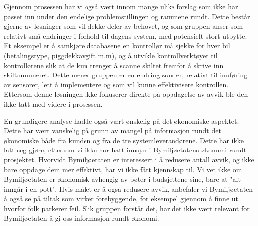 \documentclass[xetex]{beamer}
\begin{document}
\begin{frame}
	Gjennom prosessen har vi også vært innom mange ulike forslag som ikke har passet 
inn under den endelige problemstillingen og rammene rundt. Dette består gjerne av 
løsninger som vil dekke deler av behovet, og som gruppen anser som relativt \alert{små 
endringer} i forhold til dagens system, med \alert{potensielt stort utbytte}. Et eksempel er å 
samkjøre databasene en kontrollør må sjekke for hver bil (betalingstype, piggdekkavgift 
m.m), og å utvikle kontrollverktøyet til kontrollørene slik at de kun trenger å \alert{scanne skiltet} fremfor å skrive inn skiltnummeret. Dette mener gruppen er en endring som er, relativt 
til innføring av sensorer, lett å implementere og som vil kunne effektivisere kontrollen. 
Ettersom denne løsningen ikke fokuserer direkte på oppdagelse av avvik ble den ikke 
tatt med videre i prosessen.

	En grundigere analyse hadde også vært ønskelig på det økonomiske aspektet. Dette 
har vært vanskelig på grunn av mangel på informasjon rundt det økonomiske både fra 
kunden og fra de tre systemleverandørene. Dette har ikke latt seg gjøre, ettersom vi 
ikke har hatt innsyn i Bymiljøetatens økonomi rundt prosjektet. Hvorvidt Bymiljøetaten 
er interessert i å \alert{redusere antall avvik, og ikke bare oppdage dem mer effektivt}, har vi 
ikke fått kjennskap til. Vi vet ikke om Bymiljøetaten er økonomisk avhengig av bøter 
i budsjettene sine, bare at "alt inngår i en pott". Hvis målet er å også redusere avvik, 
anbefaler vi Bymiljøetaten å også se på tiltak som virker forebyggende, for eksempel 
gjennom å finne ut hvorfor folk parkerer feil. Slik gruppen forstår det, har det ikke vært relevant for Bymiljøetaten å gi oss informasjon rundt økonomi. 
\end{frame}
\end{document}
